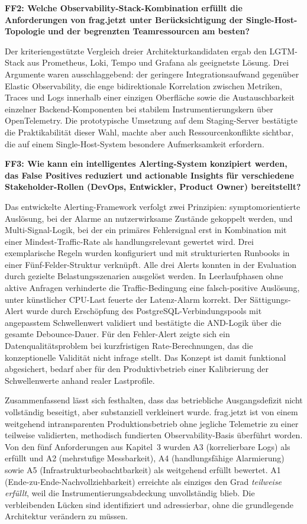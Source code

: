 \bigskip
 
\textbf{FF2: Welche Observability-Stack-Kombination erfüllt die Anforderungen von frag.jetzt unter Berücksichtigung der Single-Host-Topologie und der begrenzten Teamressourcen am besten?}
 
Der kriteriengestützte Vergleich dreier Architekturkandidaten ergab den LGTM-Stack aus Prometheus, Loki, Tempo und Grafana als geeignetste Lösung. Drei Argumente waren ausschlaggebend: der geringere Integrationsaufwand gegenüber Elastic Observability, die enge bidirektionale Korrelation zwischen Metriken, Traces und Logs innerhalb einer einzigen Oberfläche sowie die Austauschbarkeit einzelner Backend-Komponenten bei stabilem Instrumentierungskern über OpenTelemetry. Die prototypische Umsetzung auf dem Staging-Server bestätigte die Praktikabilität dieser Wahl, machte aber auch Ressourcenkonflikte sichtbar, die auf einem Single-Host-System besondere Aufmerksamkeit erfordern.
 
\bigskip
 
\textbf{FF3: Wie kann ein intelligentes Alerting-System konzipiert werden, das False Positives reduziert und actionable Insights für verschiedene Stakeholder-Rollen (DevOps, Entwickler, Product Owner) bereitstellt?}
 
Das entwickelte Alerting-Framework verfolgt zwei Prinzipien: symptomorientierte Auslösung, bei der Alarme an nutzerwirksame Zustände gekoppelt werden, und Multi-Signal-Logik, bei der ein primäres Fehlersignal erst in Kombination mit einer Mindest-Traffic-Rate als handlungsrelevant gewertet wird. Drei exemplarische Regeln wurden konfiguriert und mit strukturierten Runbooks in einer Fünf-Felder-Struktur verknüpft. Alle drei Alerts konnten in der Evaluation durch gezielte Belastungsszenarien ausgelöst werden. In Leerlaufphasen ohne aktive Anfragen verhinderte die Traffic-Bedingung eine falsch-positive Auslösung, unter künstlicher CPU-Last feuerte der Latenz-Alarm korrekt. Der Sättigungs-Alert wurde durch Erschöpfung des PostgreSQL-Verbindungspools mit angepasstem Schwellenwert validiert und bestätigte die AND-Logik über die gesamte Debounce-Dauer. Für den Fehler-Alert zeigte sich ein Datenqualitätsproblem bei kurzfristigen Rate-Berechnungen, das die konzeptionelle Validität nicht infrage stellt. Das Konzept ist damit funktional abgesichert, bedarf aber für den Produktivbetrieb einer Kalibrierung der Schwellenwerte anhand realer Lastprofile.
  
Zusammenfassend lässt sich festhalten, dass das betriebliche Ausgangsdefizit nicht vollständig beseitigt, aber substanziell verkleinert wurde. frag.jetzt ist von einem weitgehend intransparenten Produktionsbetrieb ohne jegliche Telemetrie zu einer teilweise validierten, methodisch fundierten Observability-Basis überführt worden. Von den fünf Anforderungen aus Kapitel~3 wurden A3 (korrelierbare Logs) als erfüllt und A2 (mehrstufige Messbarkeit), A4 (handlungsfähige Alarmierung) sowie A5 (Infrastrukturbeobachtbarkeit) als weitgehend erfüllt bewertet. A1 (Ende-zu-Ende-Nachvollziehbarkeit) erreichte als einziges den Grad \emph{teilweise erfüllt}, weil die Instrumentierungsabdeckung unvollständig blieb. Die verbleibenden Lücken sind identifiziert und adressierbar, ohne die grundlegende Architektur verändern zu müssen.
 
